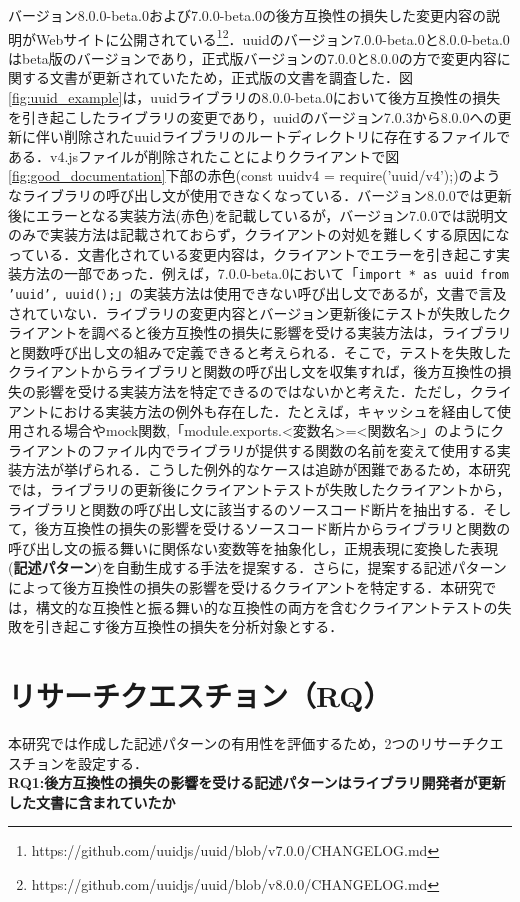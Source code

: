 \documentclass[11pt]{jreport}
\newcommand{\RQOne}{後方互換性の損失の影響を受ける記述パターンはライブラリ開発者が更新した文書に含まれていたか}
\begin{document}
バージョン8.0.0-beta.0および7.0.0-beta.0の後方互換性の損失した変更内容の説明がWebサイトに公開されている\footnote{https://github.com/uuidjs/uuid/blob/v7.0.0/CHANGELOG.md}\footnote{https://github.com/uuidjs/uuid/blob/v8.0.0/CHANGELOG.md}．uuidのバージョン7.0.0-beta.0と8.0.0-beta.0はbeta版のバージョンであり，正式版バージョンの7.0.0と8.0.0の方で変更内容に関する文書が更新されていたため，正式版の文書を調査した．図\ref{fig:uuid_example}は，uuidライブラリの8.0.0-beta.0において後方互換性の損失を引き起こしたライブラリの変更であり，uuidのバージョン7.0.3から8.0.0への更新に伴い削除されたuuidライブラリのルートディレクトリに存在するファイルである．v4.jsファイルが削除されたことによりクライアントで図\ref{fig:good_documentation}下部の赤色(const uuidv4 = require('uuid/v4’);)のようなライブラリの呼び出し文が使用できなくなっている．バージョン8.0.0では更新後にエラーとなる実装方法(赤色)を記載しているが，バージョン7.0.0では説明文のみで実装方法は記載されておらず，クライアントの対処を難しくする原因になっている．文書化されている変更内容は，クライアントでエラーを引き起こす実装方法の一部であった．例えば，7.0.0-beta.0において「\texttt{import * as uuid from 'uuid', uuid();}」の実装方法は使用できない呼び出し文であるが，文書で言及されていない．ライブラリの変更内容とバージョン更新後にテストが失敗したクライアントを調べると後方互換性の損失に影響を受ける実装方法は，ライブラリと関数呼び出し文の組みで定義できると考えられる．そこで，テストを失敗したクライアントからライブラリと関数の呼び出し文を収集すれば，後方互換性の損失の影響を受ける実装方法を特定できるのではないかと考えた．ただし，クライアントにおける実装方法の例外も存在した．たとえば，キャッシュを経由して使用される場合やmock関数,「module.exports.\textless{}変数名\textgreater{}=\textless{}関数名\textgreater{}」のようにクライアントのファイル内でライブラリが提供する関数の名前を変えて使用する実装方法が挙げられる．こうした例外的なケースは追跡が困難であるため，本研究では，ライブラリの更新後にクライアントテストが失敗したクライアントから，ライブラリと関数の呼び出し文に該当するのソースコード断片を抽出する．そして，後方互換性の損失の影響を受けるソースコード断片からライブラリと関数の呼び出し文の振る舞いに関係ない変数等を抽象化し，正規表現に変換した表現(\textbf{記述パターン})を自動生成する手法を提案する．さらに，提案する記述パターンによって後方互換性の損失の影響を受けるクライアントを特定する．本研究では，構文的な互換性と振る舞い的な互換性の両方を含むクライアントテストの失敗を引き起こす後方互換性の損失を分析対象とする．

\section{リサーチクエスチョン（RQ）}
本研究では作成した記述パターンの有用性を評価するため，2つのリサーチクエスチョンを設定する．
\\
\noindent\textbf{RQ1:\RQOne}
\end{document}

